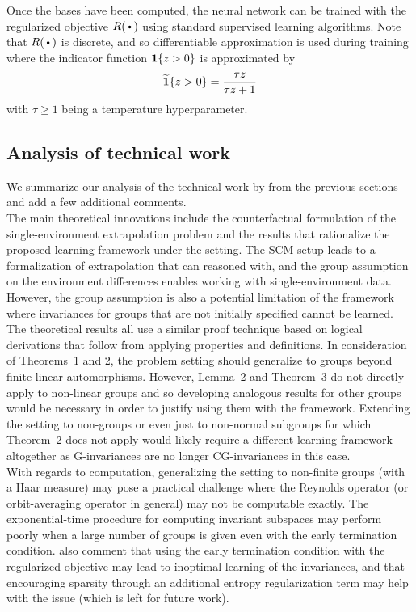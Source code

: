 Once the bases have been computed, the neural network can be trained with the regularized objective $R(\argdot)$ using standard supervised learning algorithms. Note that $R(\argdot)$ is discrete, and so differentiable approximation is used during training where the indicator function $\mathbf{1}\{z>0\}$ is approximated by
\[
\widetilde{\mathbf{1}}\{z>0\} = \frac{\tau z}{\tau z+1}
\]
with $\tau\geq1$ being a temperature hyperparameter.


\subsection{Analysis of technical work}

We summarize our analysis of the technical work by \textcite{Mouli:2021} from the previous sections and add a few additional comments.
\\

The main theoretical innovations include the counterfactual formulation of the single-environment extrapolation problem and the results that rationalize the proposed learning framework under the setting. The SCM setup leads to a formalization of extrapolation that can reasoned with, and the group assumption on the environment differences enables working with single-environment data. However, the group assumption is also a potential limitation of the framework where invariances for groups that are not initially specified cannot be learned.
\\

The theoretical results all use a similar proof technique based on logical derivations that follow from applying properties and definitions. In consideration of Theorems~1 and 2, the problem setting should generalize to groups beyond finite linear automorphisms. However, Lemma~2 and Theorem~3 do not directly apply to non-linear groups and so developing analogous results for other groups would be necessary in order to justify using them with the framework. Extending the setting to non-groups or even just to non-normal subgroups for which Theorem~2 does not apply would likely require a different learning framework altogether as G-invariances are no longer CG-invariances in this case.
\\

With regards to computation, generalizing the setting to non-finite groups (with a Haar measure) may pose a practical challenge where the Reynolds operator (or orbit-averaging operator in general) may not be computable exactly. The exponential-time procedure for computing invariant subspaces may perform poorly when a large number of groups is given even with the early termination condition. \textcite{Mouli:2021} also comment that using the early termination condition with the regularized objective may lead to inoptimal learning of the invariances, and that encouraging sparsity through an additional entropy regularization term may help with the issue (which is left for future work).

